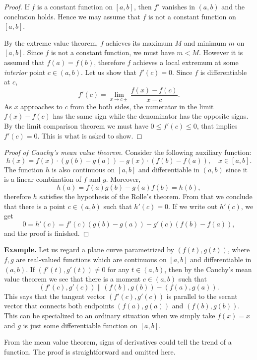\begin{proof}
  If $f$ is a constant function on $[a,b]$, then $f'$ vanishes in $(a,b)$ and the conclusion holds.
  Hence we may assume that $f$ is not a constant function on $[a,b]$.

  By the extreme value theorem, $f$ achieves its maximum $M$ and minimum $m$ on $[a,b]$.  Since $f$ is not a constant function, we must have $m < M$.
  However it is assumed that $f(a) = f(b)$, therefore $f$ achieves a local extremum at some \textit{interior} point $c \in (a,b)$.
  Let us show that $f'(c) = 0$.
  Since $f$ is differentiable at $c$,
  \[
    f'(c) = \lim_{x \to c\pm} \frac{ f(x) - f(c) }{x - c}.
  \]
  As $x$ approaches to $c$ from the both sides, the numerator in the limit $f(x) - f(c)$ has the same sign while the denominator has the opposite signs.
  By the limit comparison theorem we must have $0 \leqslant f'(c) \leqslant 0$, that implies $f'(c) = 0$.  This is what is asked to show.
\end{proof}

\begin{proof}[Proof of Cauchy's mean value theorem]
  Consider the following auxiliary function:
  \[
    h(x) = f(x) \cdot (g(b) - g(a)) - g(x) \cdot (f(b) - f(a)), \quad x \in [a,b].
  \]
  The function $h$ is also continuous on $[a,b]$ and differentiable in $(a,b)$ since it is a linear combination of $f$ and $g$.
  Moreover,
  \[
    h(a) = f(a) g(b) - g(a) f(b) = h(b),
  \]
  therefore $h$ satisfies the hypothesis of the Rolle's theorem.
  From that we conclude that there is a point $c \in (a,b)$ such that $h'(c) = 0$.  If we write out $h'(c)$, we get
  \[
    0 = h'(c) = f'(c) (g(b) - g(a)) - g'(c) (f(b) - f(a)),
  \]
  and the proof is finished.
\end{proof}

\noindent\textbf{Example.}
Let us regard a plane curve parametrized by $(f(t), g(t))$, where $f, g$ are real-valued functions which are continuous on $[a,b]$ and differentiable in $(a,b)$.
If $(f'(t), g'(t)) \ne 0$ for any $t \in (a,b)$, then by the Cauchy's mean value theorem we see that there is a moment $c \in (a,b)$ such that
\[
  (f'(c), g'(c)) \parallel (f(b), g(b)) - (f(a), g(a)).
\]
This says that the tangent vector $(f'(c), g'(c))$ is parallel to the secant vector that connects both endpoints $(f(a),g(a))$ and $(f(b), g(b))$.
This can be specialized to an ordinary situation when we simply take $f(x) = x$ and $g$ is just some differentiable function on $[a,b]$.

\medskip
From the mean value theorem, signs of derivatives could tell the trend of a function.  The proof is straightforward and omitted here.

